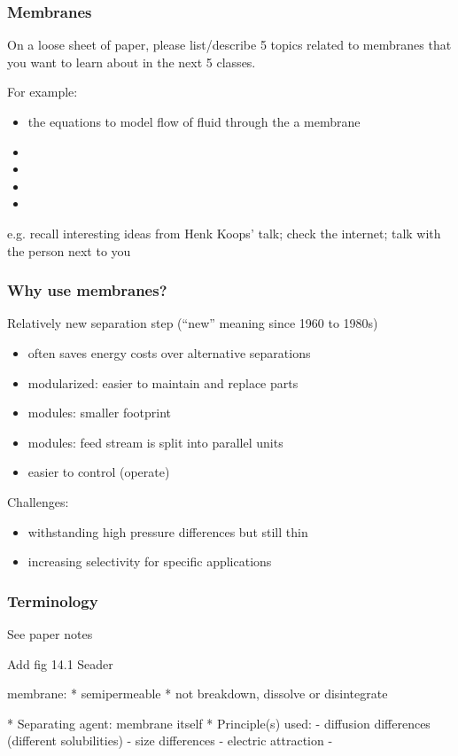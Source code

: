 \begin{frame}\frametitle{Membranes}
	On a loose sheet of paper, please list/describe 5 topics related to membranes that you want to learn about in the next 5 classes.
	
	\vspace{12pt}
	For example:
	\begin{itemize}
		\item	the equations to model flow of fluid through the a membrane
		\item	
		\item	
		\item	
		\item	
	\end{itemize}
	
	\vspace{12pt}
	e.g. recall interesting ideas from Henk Koops' talk; check the internet; talk with the person next to you
\end{frame}

\begin{frame}\frametitle{Why use membranes?}
	Relatively new separation step (``new'' meaning since 1960 to 1980s)
	\begin{itemize}
		\item	often saves energy costs over alternative separations
		\item	modularized: easier to maintain and replace parts
		\item	modules: smaller footprint
		\item	modules: feed stream is split into parallel units
		\item	easier to control (operate)
	\end{itemize}
	Challenges:
	\begin{itemize}
		\item	withstanding high pressure differences but still thin
		\item	increasing selectivity for specific applications
	\end{itemize}
\end{frame}

\begin{frame}\frametitle{Terminology}
	See paper notes
	
	Add fig 14.1 Seader
	
	membrane: 
	* semipermeable
	* not breakdown, dissolve or disintegrate
	
	* Separating agent: membrane itself
	* Principle(s) used:
	 - diffusion differences (different solubilities)
	 - size differences
	 - electric attraction
	 - 
	
\end{frame}

